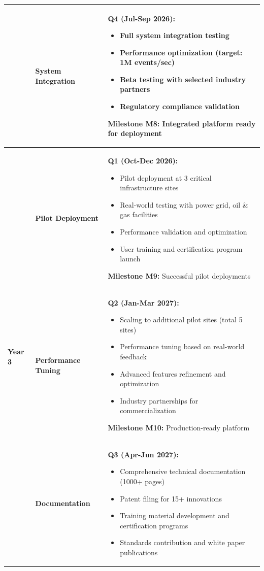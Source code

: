 \documentclass[12pt,a4paper]{article}
\begin{document}
\begin{longtable}{|p{2cm}|p{4cm}|p{8.5cm}|}
& \textbf{System Integration} & 
\textbf{Q4 (Jul-Sep 2026):}
\begin{itemize}[leftmargin=1em, itemsep=0pt]
    \item Full system integration testing
    \item Performance optimization (target: 1M events/sec)
    \item Beta testing with selected industry partners
    \item Regulatory compliance validation
\end{itemize}

\textbf{Milestone M8:} Integrated platform ready for deployment \\
\hline

\multirow{8}{*}{\textbf{Year 3}} & \textbf{Pilot Deployment} & 
\textbf{Q1 (Oct-Dec 2026):}
\begin{itemize}[leftmargin=1em, itemsep=0pt]
    \item Pilot deployment at 3 critical infrastructure sites
    \item Real-world testing with power grid, oil \& gas facilities
    \item Performance validation and optimization
    \item User training and certification program launch
\end{itemize}

\textbf{Milestone M9:} Successful pilot deployments \\
\cline{2-3}

& \textbf{Performance Tuning} & 
\textbf{Q2 (Jan-Mar 2027):}
\begin{itemize}[leftmargin=1em, itemsep=0pt]
    \item Scaling to additional pilot sites (total 5 sites)
    \item Performance tuning based on real-world feedback
    \item Advanced features refinement and optimization
    \item Industry partnerships for commercialization
\end{itemize}

\textbf{Milestone M10:} Production-ready platform \\
\cline{2-3}

& \textbf{Documentation} & 
\textbf{Q3 (Apr-Jun 2027):}
\begin{itemize}[leftmargin=1em, itemsep=0pt]
    \item Comprehensive technical documentation (1000+ pages)
    \item Patent filing for 15+ innovations
    \item Training material development and certification programs
    \item Standards contribution and white paper publications
\end{itemize}


\end{longtable}
\end{document}

